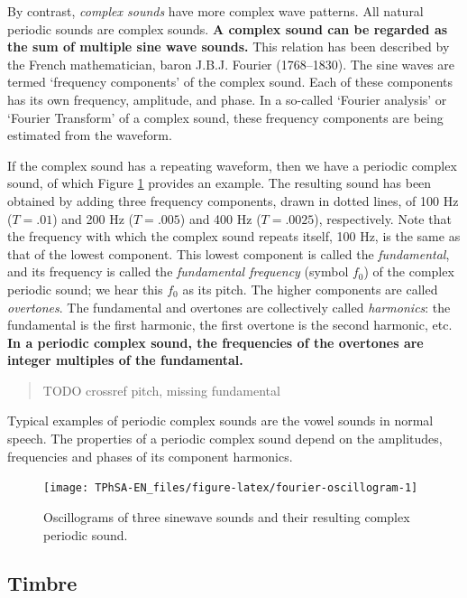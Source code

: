 \documentclass[
]{book}
\begin{document}
By contrast, \emph{complex sounds} have more complex wave patterns. All natural periodic sounds are complex sounds. \textbf{A complex sound can be regarded as the sum of multiple sine wave sounds.} This relation has been described by the French mathematician, baron J.B.J. Fourier (1768--1830). The sine waves are termed `frequency components' of the complex sound. Each of these components has its own frequency, amplitude, and phase. In a so-called `Fourier analysis' or `Fourier Transform' of a complex sound, these frequency components are being estimated from the waveform.

If the complex sound has a repeating waveform, then we have a periodic complex sound, of which Figure \ref{fig:fourier-oscillogram} provides an example. The resulting sound has been obtained by adding three frequency components, drawn in dotted lines, of 100 Hz (\(T=.01\)) and 200 Hz (\(T=.005\)) and 400 Hz (\(T=.0025\)), respectively. Note that the frequency with which the complex sound repeats itself, 100 Hz, is the same as that of the lowest component. This lowest component is called the \emph{fundamental}, and its frequency is called the \emph{fundamental frequency} (symbol \(f_0\)) of the complex periodic sound; we hear this \(f_0\) as its pitch. The higher components are called \emph{overtones}. The fundamental and overtones are collectively called \emph{harmonics}: the fundamental is the first harmonic, the first overtone is the second harmonic, etc.
\textbf{In a periodic complex sound, the frequencies of the overtones are integer multiples of the fundamental.}

\begin{quote}
TODO crossref pitch, missing fundamental
\end{quote}

Typical examples of periodic complex sounds are the vowel sounds in normal speech. The properties of a periodic complex sound depend on the amplitudes, frequencies and phases of its component harmonics.

\begin{figure}

{\centering \texttt{[image: TPhSA-EN\_files/figure-latex/fourier-oscillogram-1]} 

}

\caption{Oscillograms of three sinewave sounds and their resulting complex periodic sound.}\label{fig:fourier-oscillogram}
\end{figure}

\subsection{Timbre}\label{timbre}
\end{document}
